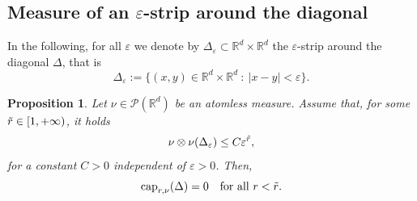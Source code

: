 \documentclass[10pt,leqno]{amsart}
\numberwithin{equation}{section}
\newtheorem{prop}[teorema]{Proposition}
\newcommand{\R}{\mathbb{R}}
\newcommand{\PP}{\mathcal{P}}
\begin{document}
\subsection{Measure of an \texorpdfstring{$\varepsilon$}{}-strip around the diagonal}
In the following, for all $\varepsilon$ we denote by $\Delta_\varepsilon\subset \R^d \times \R^d$ the $\varepsilon$-strip around the diagonal $\Delta$, that is
\begin{equation}
    \Delta_\varepsilon := \{(x,y) \in \R^d \times \R^d \ : \ |x-y|<\varepsilon\}.
\end{equation}

\begin{prop}\label{prop: strip}
    Let $\nu\in \PP(\R^d)$ be an atomless measure. Assume that, for some $\Tilde{r}\in [1,+\infty)$, it holds
    \begin{equation}\label{eq: strip rate}
        \nu\otimes \nu (\Delta_\varepsilon)\leq C \varepsilon^{\Tilde{r}},
    \end{equation}
    for a constant $C>0$ independent of $\varepsilon>0$. Then, 
    \begin{equation}
        \operatorname{cap}_{r,\nu}(\Delta) = 0 \quad \text{for all }r<\Tilde{r}.
    \end{equation}
\end{prop}
\end{document}

